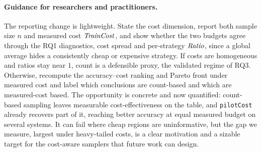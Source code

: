 \paragraph*{Guidance for researchers and practitioners.}
The reporting change is lightweight. State the cost dimension, report both sample
size $n$ and measured cost $\mathit{TrainCost}$, and show whether the two budgets agree
through the RQ1 diagnostics, cost spread and per-strategy $\mathit{Ratio}$, since a global
average hides a consistently cheap or expensive strategy. If costs are homogeneous
and ratios stay near $1$, count is a defensible proxy, the validated regime of
RQ3. Otherwise, recompute the
accuracy--cost ranking and Pareto front under measured cost and label which
conclusions are count-based and which are measured-cost based. The opportunity is
concrete and now quantified: count-based sampling leaves measurable
cost-effectiveness on the table, and \texttt{pilotCost} already recovers part of
it, reaching better accuracy at equal measured budget on several systems. It can
fail where cheap regions are uninformative, but the gap we measure, largest under
heavy-tailed costs, is a clear motivation and a sizable target for the cost-aware
samplers that future work can design.
